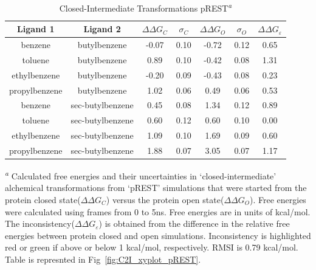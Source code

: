 \begin{table}[!htb]
 \centering
 \caption{Closed-Intermediate Transformations pREST\textsuperscript{\emph{a}}} 
 \label{tbl:C-I_pREST}
 \begin{tabular}{|c|c|c|c|c|c|c|}
 \hline
 \textbf{Ligand 1}       & \textbf{Ligand 2}    & \boldmath$\Delta\Delta G_{C}$ & \boldmath$\sigma_{C}$ & \boldmath$\Delta\Delta G_{O}$ & \boldmath$\sigma_{O}$ & \boldmath$\Delta\Delta G_{\varepsilon}$ \\ \hline
benzene         & butylbenzene   & -0.07   & 0.10     & -0.72     & 0.12     & \cellcolor[HTML]{9AFF99}0.65 \\ \hline
toluene         & butylbenzene   & 0.89    & 0.10     & -0.42     & 0.08     & \cellcolor[HTML]{FFCCC9}1.31 \\ \hline
ethylbenzene    & butylbenzene   & -0.20   & 0.09     & -0.43     & 0.08     & \cellcolor[HTML]{9AFF99}0.23 \\ \hline
propylbenzene & butylbenzene   & 1.02    & 0.06     & 0.49      & 0.06     & \cellcolor[HTML]{9AFF99}0.53 \\ \hline
benzene         & sec-butylbenzene & 0.45    & 0.08     & 1.34      & 0.12     & \cellcolor[HTML]{9AFF99}0.89 \\ \hline
toluene         & sec-butylbenzene & 0.60    & 0.12     & 0.60      & 0.10     & \cellcolor[HTML]{9AFF99}0.00 \\ \hline
ethylbenzene    & sec-butylbenzene & 1.09    & 0.10     & 1.69      & 0.09     & \cellcolor[HTML]{9AFF99}0.60 \\ \hline
propylbenzene & sec-butylbenzene & 1.88    & 0.07     & 3.05      & 0.07     & \cellcolor[HTML]{FFCCC9}1.17 \\ \hline
 \end{tabular}

\textsuperscript{\emph{a}} Calculated free energies and their uncertainties in `closed-intermediate' alchemical transformations from `pREST' simulations that were started from the protein closed state(\boldmath$\Delta\Delta G_{C}$) versus the protein open state(\boldmath$\Delta\Delta G_{O}$).
Free energies were calculated using frames from 0 to 5ns. 
Free energies are in units of kcal/mol.
The inconsistency(\boldmath$\Delta\Delta G_{\varepsilon}$) is obtained from the difference in the relative free energies between protein closed and open simulations. 
Inconsistency is highlighted red or green if above or below 1 kcal/mol, respectively.
RMSI is 0.79 kcal/mol.
Table is represnted in Fig~\ref{fig:C2I_xyplot_pREST}.
 \end{table}


